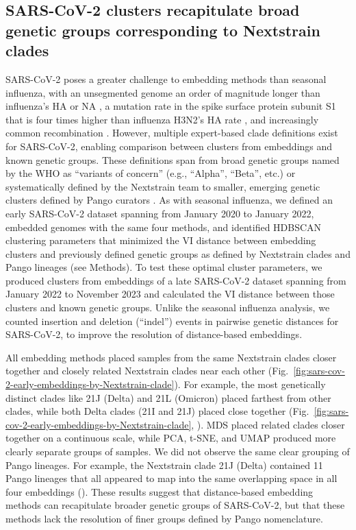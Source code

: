 \documentclass[10pt,letterpaper]{article}
\begin{document}
\subsection*{SARS-CoV-2 clusters recapitulate broad genetic groups corresponding to Nextstrain clades}

SARS-CoV-2 poses a greater challenge to embedding methods than seasonal influenza, with an unsegmented genome an order of magnitude longer than influenza's HA or NA \cite{Zhu2020}, a mutation rate in the spike surface protein subunit S1 that is four times higher than influenza H3N2's HA rate \cite{Kistler2022}, and increasingly common recombination \cite{Focosi2022,Turakhia2022}.
However, multiple expert-based clade definitions exist for SARS-CoV-2, enabling comparison between clusters from embeddings and known genetic groups.
These definitions span from broad genetic groups named by the WHO as ``variants of concern'' (e.g., ``Alpha'', ``Beta'', etc.) \cite{Konings2021} or systematically defined by the Nextstrain team \cite{Hodcroft2020,Bedford2021,Roemer2022} to smaller, emerging genetic clusters defined by Pango curators \cite{OToole2021}.
As with seasonal influenza, we defined an early SARS-CoV-2 dataset spanning from January 2020 to January 2022, embedded genomes with the same four methods, and identified HDBSCAN clustering parameters that minimized the VI distance between embedding clusters and previously defined genetic groups as defined by Nextstrain clades and Pango lineages (see Methods).
To test these optimal cluster parameters, we produced clusters from embeddings of a late SARS-CoV-2 dataset spanning from January 2022 to November 2023 and calculated the VI distance between those clusters and known genetic groups.
Unlike the seasonal influenza analysis, we counted insertion and deletion (``indel'') events in pairwise genetic distances for SARS-CoV-2, to improve the resolution of distance-based embeddings.

All embedding methods placed samples from the same Nextstrain clades closer together and closely related Nextstrain clades near each other (Fig.~\ref{fig:sars-cov-2-early-embeddings-by-Nextstrain-clade}).
For example, the most genetically distinct clades like 21J (Delta) and 21L (Omicron) placed farthest from other clades, while both Delta clades (21I and 21J) placed close together (Fig.~\ref{fig:sars-cov-2-early-embeddings-by-Nextstrain-clade}, ).
MDS placed related clades closer together on a continuous scale, while PCA, t-SNE, and UMAP produced more clearly separate groups of samples.
We did not observe the same clear grouping of Pango lineages.
For example, the Nextstrain clade 21J (Delta) contained 11 Pango lineages that all appeared to map into the same overlapping space in all four embeddings ().
These results suggest that distance-based embedding methods can recapitulate broader genetic groups of SARS-CoV-2, but that these methods lack the resolution of finer groups defined by Pango nomenclature.
\end{document}
